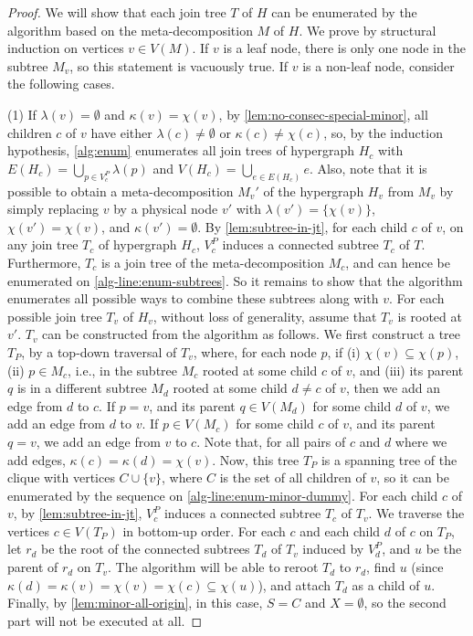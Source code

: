 \begin{proof}
    We will show that each join tree $T$ of $H$ can be enumerated by the algorithm based on the meta-decomposition $M$ of $H$.
    We prove by structural induction on vertices $v \in V(M)$. If $v$ is a leaf node, there is only one node in the subtree $M_v$, so this statement is vacuously true. If $v$ is a non-leaf node, consider the following cases.
    
    (1) If $\lambda(v) = \emptyset$ and $\kappa(v) = \chi(v)$, by \cref{lem:no-consec-special-minor}, all children $c$ of $v$ have either $\lambda(c) \neq \emptyset$ or $\kappa(c) \neq \chi(c)$, so, by the induction hypothesis, \cref{alg:enum} enumerates all join trees of hypergraph $H_c$ with $E(H_c) = \bigcup_{p \in V_c^P} \lambda(p)$ and $V(H_c) = \bigcup_{e \in E(H_c)} e$.
    Also, note that it is possible to obtain a meta-decomposition $M_v'$ of the hypergraph $H_v$ from $M_v$ by simply replacing $v$ by a physical node $v'$ with $\lambda(v') = \{ \chi(v) \}$, $\chi(v') = \chi(v)$, and $\kappa(v') = \emptyset$.
    By \cref{lem:subtree-in-jt}, for each child $c$ of $v$, on any join tree $T_c$ of hypergraph $H_c$, $V_c^P$ induces a connected subtree $T_c$ of $T$.
    Furthermore, $T_c$ is a join tree of the meta-decomposition $M_c$, and can hence be enumerated on \cref{alg-line:enum-subtrees}.
    So it remains to show that the algorithm enumerates all possible ways to combine these subtrees along with $v$.
    For each possible join tree $T_v$ of $H_v$, without loss of generality, assume that $T_v$ is rooted at $v'$.
    $T_v$ can be constructed from the algorithm as follows.
    We first construct a tree $T_P$,
    by a top-down traversal of $T_v$, where, for each node $p$,
    if (i) $\chi(v) \subseteq \chi(p)$, (ii) $p \in M_c$, i.e., in the subtree $M_c$ rooted at some child $c$ of $v$, and (iii) its parent $q$ is in a different subtree $M_d$ rooted at some child $d \neq c$ of $v$, then we add an edge from $d$ to $c$.
    If $p = v$, and its parent $q \in V(M_d)$ for some child $d$ of $v$, we add an edge from $d$ to $v$.
    If $p \in V(M_c)$ for some child $c$ of $v$, and its parent $q = v$, we add an edge from $v$ to $c$.
    Note that, for all pairs of $c$ and $d$ where we add edges, $\kappa(c) = \kappa(d) = \chi(v)$.
    Now, this tree $T_P$ is a spanning tree of the clique with vertices $C \cup \{ v \}$, where $C$ is the set of all children of $v$, so it can be enumerated by the \prufer{} sequence on \cref{alg-line:enum-minor-dummy}.
    For each child $c$ of $v$, by \cref{lem:subtree-in-jt}, $V_c^P$ induces a connected subtree $T_c$ of $T_v$.
    We traverse the vertices $c \in V(T_P)$ in bottom-up order.
    For each $c$ and each child $d$ of $c$ on $T_P$, %
    let $r_d$ be the root of the connected subtrees $T_d$ of $T_v$ induced by $V_d^P$, and $u$ be the parent of $r_d$ on $T_v$.
    The algorithm will be able to reroot $T_d$ to $r_d$, find $u$ (since $\kappa(d) = \kappa(v) = \chi(v) = \chi(c) \subseteq \chi(u)$), and attach $T_d$ as a child of $u$.
    Finally, by \cref{lem:minor-all-origin}, in this case, $S = C$ and $X = \emptyset$, so the second part will not be executed at all.


\end{proof}
